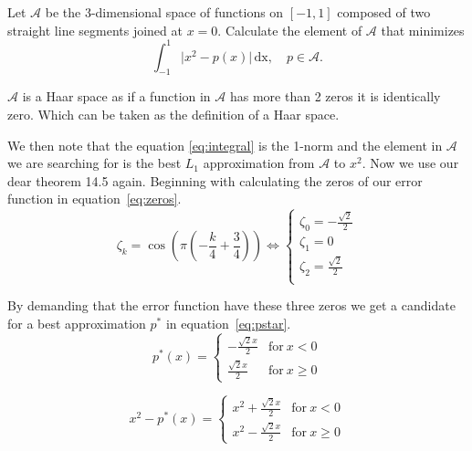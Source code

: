\begin{problem}
  Let $\mathcal{A}$ be the 3-dimensional space of functions on
  $[-1,1]$ composed of two straight line segments joined at $x =
  0$. Calculate the element of $\mathcal{A}$ that minimizes
  \begin{equation}
    \label{eq:integral}
\int_{-1}^1 \lvert x^2 - p(x) \rvert \, \text{dx}, \quad p \in \mathcal{A}.
\end{equation}
\end{problem}


\begin{solution}
$\mathcal{A}$ is a Haar space as if a function in $\mathcal{A}$ has
more than 2 zeros it is identically zero. Which can be taken as the
definition of a Haar space.

We then note that the equation \ref{eq:integral} is the 1-norm and the
element in $\mathcal{A}$ we are searching for is the best $L_1$
approximation from $\mathcal{A}$ to $x^2$. Now we use our dear theorem 14.5 again. Beginning with calculating the
zeros of our error function in equation~\ref{eq:zeros}. 
\begin{equation}
  \label{eq:zeros}
\zeta_k = \cos{\left (\pi \left(- \frac{k}{4} + \frac{3}{4}\right)
  \right )}
  \Leftrightarrow
  \begin{cases}
    \zeta_0 = - \frac{\sqrt{2}}{2} \\
    \zeta_1 = 0 \\
    \zeta_2 = \frac{\sqrt{2}}{2} \\
  \end{cases}
\end{equation}

By demanding that the error function have these three zeros we get a
candidate for a best approximation $p^*$ in
equation~\ref{eq:pstar}. 
\begin{equation}
  \label{eq:pstar}
  p^*(x)  = 
  \begin{cases}
    - \frac{\sqrt{2} x}{2} & \text{for}\: x < 0 \\
    \frac{\sqrt{2} x }{2} & \text{for}\: x \geq 0    
  \end{cases}
\end{equation}

\begin{equation}
  \label{eq:task_4:error}
  x^2 - p^*(x)  = 
  \begin{cases}
    x^{2} + \frac{\sqrt{2} x}{2} & \text{for}\: x < 0 \\
    x^{2} - \frac{\sqrt{2} x}{2} & \text{for}\: x \geq 0
  \end{cases}
\end{equation}


\end{solution}
